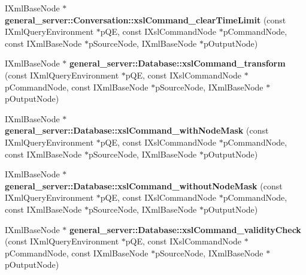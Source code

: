 \begin{DoxyCompactItemize}
\item 
\hypertarget{group__XSLModule-Commands_gaf2de48d9e9ae0b9fed051bff99d83df6}{\-I\-Xml\-Base\-Node $\ast$ {\bfseries general\-\_\-server\-::\-Conversation\-::xsl\-Command\-\_\-clear\-Time\-Limit} (const \-I\-Xml\-Query\-Environment $\ast$p\-Q\-E, const \-I\-Xsl\-Command\-Node $\ast$p\-Command\-Node, const \-I\-Xml\-Base\-Node $\ast$p\-Source\-Node, \-I\-Xml\-Base\-Node $\ast$p\-Output\-Node)}\label{group__XSLModule-Commands_gaf2de48d9e9ae0b9fed051bff99d83df6}

\item 
\hypertarget{group__XSLModule-Commands_gabb330e7c756bfe86efa3575d28423ea4}{\-I\-Xml\-Base\-Node $\ast$ {\bfseries general\-\_\-server\-::\-Database\-::xsl\-Command\-\_\-transform} (const \-I\-Xml\-Query\-Environment $\ast$p\-Q\-E, const \-I\-Xsl\-Command\-Node $\ast$p\-Command\-Node, const \-I\-Xml\-Base\-Node $\ast$p\-Source\-Node, \-I\-Xml\-Base\-Node $\ast$p\-Output\-Node)}\label{group__XSLModule-Commands_gabb330e7c756bfe86efa3575d28423ea4}

\item 
\hypertarget{group__XSLModule-Commands_gab2cb360c41c9c85c7ed41352e3316eb5}{\-I\-Xml\-Base\-Node $\ast$ {\bfseries general\-\_\-server\-::\-Database\-::xsl\-Command\-\_\-with\-Node\-Mask} (const \-I\-Xml\-Query\-Environment $\ast$p\-Q\-E, const \-I\-Xsl\-Command\-Node $\ast$p\-Command\-Node, const \-I\-Xml\-Base\-Node $\ast$p\-Source\-Node, \-I\-Xml\-Base\-Node $\ast$p\-Output\-Node)}\label{group__XSLModule-Commands_gab2cb360c41c9c85c7ed41352e3316eb5}

\item 
\hypertarget{group__XSLModule-Commands_ga0ed207ec17eee242bc51cd8238386916}{\-I\-Xml\-Base\-Node $\ast$ {\bfseries general\-\_\-server\-::\-Database\-::xsl\-Command\-\_\-without\-Node\-Mask} (const \-I\-Xml\-Query\-Environment $\ast$p\-Q\-E, const \-I\-Xsl\-Command\-Node $\ast$p\-Command\-Node, const \-I\-Xml\-Base\-Node $\ast$p\-Source\-Node, \-I\-Xml\-Base\-Node $\ast$p\-Output\-Node)}\label{group__XSLModule-Commands_ga0ed207ec17eee242bc51cd8238386916}

\item 
\hypertarget{group__XSLModule-Commands_ga8fd8810e91d25af972b38b80036763c5}{\-I\-Xml\-Base\-Node $\ast$ {\bfseries general\-\_\-server\-::\-Database\-::xsl\-Command\-\_\-validity\-Check} (const \-I\-Xml\-Query\-Environment $\ast$p\-Q\-E, const \-I\-Xsl\-Command\-Node $\ast$p\-Command\-Node, const \-I\-Xml\-Base\-Node $\ast$p\-Source\-Node, \-I\-Xml\-Base\-Node $\ast$p\-Output\-Node)}\label{group__XSLModule-Commands_ga8fd8810e91d25af972b38b80036763c5}


\end{DoxyCompactItemize}
